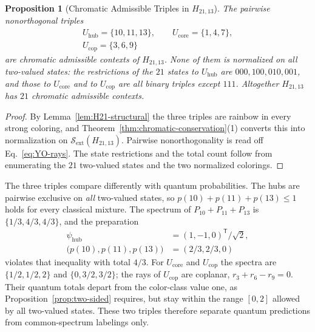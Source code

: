 \documentclass[aps,pra,reprint,superscriptaddress,longbibliography,nofootinbib,floatfix,10pt]{revtex4-2}
\newtheorem{proposition}[theorem]{Proposition}
\theoremstyle{definition}\newtheorem{definition}[theorem]{Definition}
\theoremstyle{remark}\newtheorem{remark}[theorem]{Remark}
\newcommand{\Sc}{\mathcal S}\newcommand{\Cc}{\mathcal C}\newcommand{\Wc}{\mathcal W}
\begin{document}
\begin{proposition}[Chromatic Admissible Triples in $H_{21,13}$]\label{prop:H21-triples}
The pairwise nonorthogonal triples
\begin{equation}\label{eq:H21-triples}
\begin{gathered}
U_{\mathrm{hub}}=\{10,11,13\},\qquad U_{\mathrm{core}}=\{1,4,7\},\\
U_{\mathrm{cop}}=\{3,6,9\}
\end{gathered}
\end{equation}
are chromatic admissible contexts of $H_{21,13}$. None of them is normalized on all two-valued states: the restrictions of the $21$ states to $U_{\mathrm{hub}}$ are $000,100,010,001$, and those to $U_{\mathrm{core}}$ and to $U_{\mathrm{cop}}$ are all binary triples except $111$. Altogether $H_{21,13}$ has $21$ chromatic admissible contexts.
\end{proposition}
\begin{proof}
By Lemma~\ref{lem:H21-structural} the three triples are rainbow in every strong coloring, and Theorem~\ref{thm:chromatic-conservation}(1) converts this into normalization on $\Sc_{\mathrm{ext}}(H_{21,13})$. Pairwise nonorthogonality is read off Eq.~\eqref{eq:YO-rays}. The state restrictions and the total count follow from enumerating the $21$ two-valued states and the two normalized colorings.
\end{proof}
The three triples compare differently with quantum probabilities. The hubs are pairwise exclusive on \emph{all} two-valued states, so $p(10)+p(11)+p(13)\le1$ holds for every classical mixture. The spectrum of $P_{10}+P_{11}+P_{13}$ is $\{1/3,4/3,4/3\}$, and the preparation
\begin{equation}\label{eq:H21-hub-explicit-witness}
\begin{aligned}
\psi_{\mathrm{hub}}&=(1,-1,0)^{\mathsf T}/\sqrt2,\\
\bigl(p(10),p(11),p(13)\bigr)&=(2/3,2/3,0)
\end{aligned}
\end{equation}
violates that inequality with total $4/3$. For $U_{\mathrm{core}}$ and $U_{\mathrm{cop}}$ the spectra are $\{1/2,1/2,2\}$ and $\{0,3/2,3/2\}$; the rays of $U_{\mathrm{cop}}$ are coplanar, $r_3+r_6-r_9=0$. Their quantum totals depart from the color-class value one, as Proposition~\ref{prop:two-sided} requires, but stay within the range $[0,2]$ allowed by all two-valued states. These two triples therefore separate quantum predictions from common-spectrum labelings only.
\end{document}
